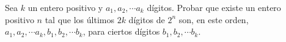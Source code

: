 Sea $k$ un entero positivo y $a_1, a_2, \cdots a_k$ dígitos. Probar que existe un entero positivo $n$ tal que los últimos $2k$ dígitos de $2^n$ son, en este orden, $a_1,a_2, \cdots a_k, b_1, b_2, \cdots b_k$, para ciertos dígitos $b_1,b_2,\cdots b_k$.
